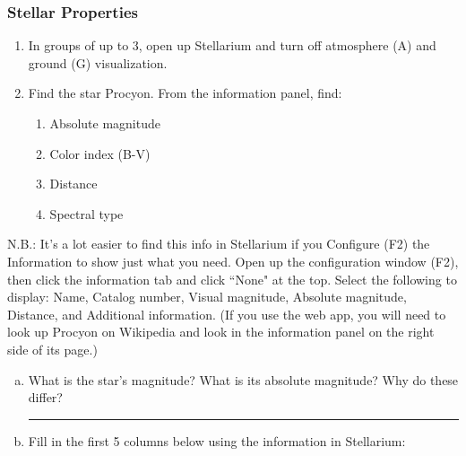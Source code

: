 \documentclass[main.tex]{subfiles}
\begin{document}
\subsubsection{Stellar Properties}
\begin{enumerate}
\item In groups of up to 3, open up Stellarium and turn off atmosphere (A) and ground (G) visualization.
\item Find the star Procyon. From the information panel, find:
	\begin{enumerate}
	\item Absolute magnitude
	\item Color index (B-V)
	\item Distance
	\item Spectral type
	\end{enumerate}
\end{enumerate}
N.B.: It's a lot easier to find this info in Stellarium if you Configure (F2) the Information to show just what you need. Open up the configuration window (F2), then click the information tab and click ``None" at the top. Select the following to display: Name, Catalog number, Visual magnitude, Absolute magnitude, Distance, and Additional information. (If you use the web app, you will need to look up Procyon on Wikipedia and look in the information panel on the right side of its page.)

\begin{enumerate}[a.]
\item What is the star's magnitude? What is its absolute magnitude? Why do these differ? 

\rule{15cm}{.15mm}
\item Fill in the first 5 columns below using the information in Stellarium:
\end{enumerate}
\end{document}
